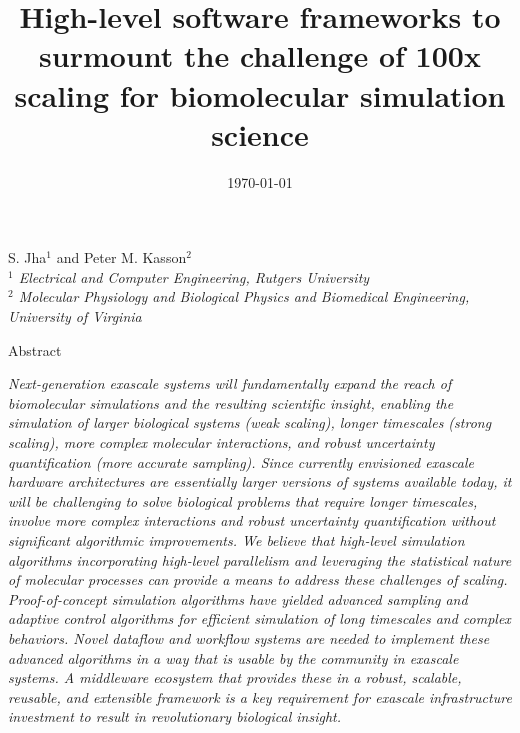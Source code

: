 \documentclass[10pt,letterpaper,draft]{article}
\date{\today}
\begin{document}
\title{\bf High-level software frameworks to surmount the challenge of 100x
  scaling for biomolecular simulation science}

\maketitle





\renewcommand{\thepage}{\arabic{page}}


\thispagestyle{empty}
\begin{center} 

\vspace{0.25in}
\large S. Jha$^1$ and Peter M. Kasson$^2$\\

\small {\it $^1$ Electrical and Computer Engineering, Rutgers University} \\
\small {\it $^2$ Molecular Physiology and Biological Physics and Biomedical
  Engineering, University of Virginia}

\vspace{0.25in}

\large Abstract

\end{center} {\it Next-generation exascale systems will fundamentally expand the reach of biomolecular simulations and the resulting scientific insight, enabling the simulation of larger biological systems (weak scaling), longer timescales (strong scaling), more complex molecular interactions, and robust uncertainty quantification (more accurate sampling).  Since currently envisioned exascale hardware architectures are essentially larger versions of systems available today, it will be challenging to solve biological problems that require longer timescales, involve more complex interactions and robust uncertainty quantification without significant algorithmic improvements.  We believe that high-level simulation algorithms incorporating high-level parallelism and leveraging the statistical nature of molecular processes can provide a means to address these challenges of scaling.  Proof-of-concept simulation algorithms have yielded advanced sampling and adaptive control algorithms for efficient simulation of long timescales and complex behaviors. Novel dataflow and workflow systems are needed to implement these advanced algorithms in a way that is usable by the community in exascale systems. A middleware ecosystem that provides these in a robust, scalable, reusable, and extensible framework is a key requirement for exascale infrastructure investment to result in revolutionary biological insight.  }
\end{document}
